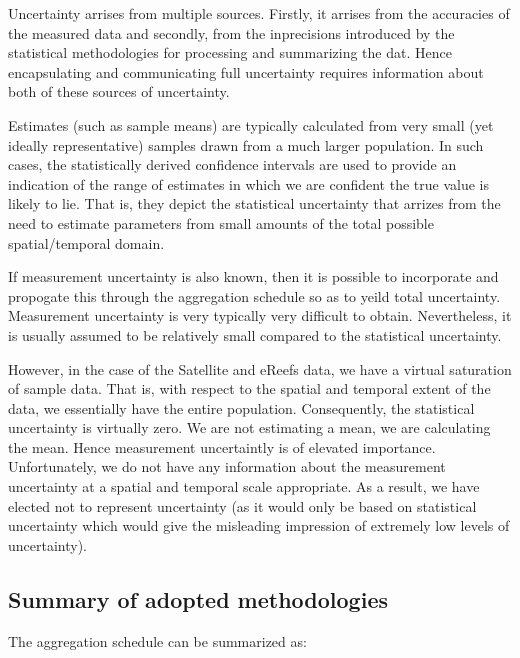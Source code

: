 Uncertainty arrises from multiple sources.  Firstly, it arrises from the accuracies of the measured data
and secondly, from the inprecisions introduced by the statistical methodologies for processing and summarizing
the dat.  Hence encapsulating and communicating full uncertainty requires information about both of these
sources of uncertainty.

Estimates (such as sample means) are typically calculated from very small (yet ideally representative) samples
drawn from a much larger population.  In such cases, the statistically derived confidence intervals are used to provide
an indication of the range of estimates in which we are confident the true value is likely to lie.
That is, they depict the statistical uncertainty that arrizes from the need to estimate parameters from
small amounts of the total possible spatial/temporal domain.

If measurement uncertainty is also known, then it is possible to incorporate and propogate this through
the aggregation schedule so as to yeild total uncertainty.  Measurement uncertainty is very typically
very difficult to obtain.  Nevertheless, it is usually assumed to be relatively small compared to
the statistical uncertainty.

However, in the case of the Satellite and eReefs data, we have a virtual saturation of sample data.  That is,
with respect to the spatial and temporal extent of the data, we essentially have the entire population.
Consequently, the statistical uncertainty is virtually zero.  We are not estimating a mean, we
are calculating the mean.  Hence measurement uncertaintly is of elevated importance.  Unfortunately,
we do not have any information about the measurement uncertainty at a spatial and temporal scale
appropriate.  As a result, we have elected not to represent uncertainty (as it would only be based on
statistical uncertainty which would give the misleading impression of extremely low levels of uncertainty).


\subsection{Summary of adopted methodologies}

The aggregation schedule can be summarized as:

\tikzexternaldisable

